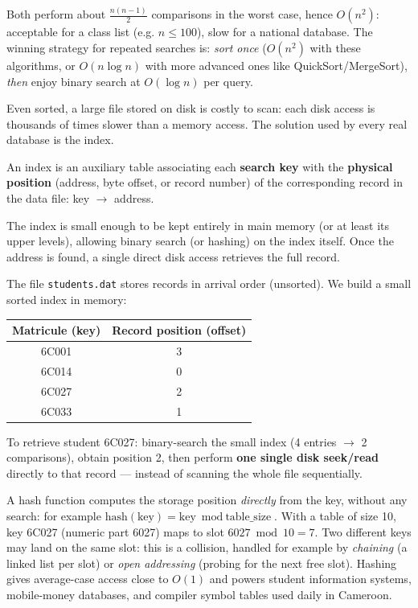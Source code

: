 \documentclass[11pt]{article}
\newcommand{\cle}[1]{{\popxbold\color{popdark}#1}}
\newcounter{popsec}
\newcounter{popsub}
\newcommand{\courssub}[1]{%
  \stepcounter{popsub}%
  \par\vspace{9pt}\noindent{\popxbold\fontsize{11.5}{13}\selectfont\color{popink}{\color{poporange}\thepopsec.\thepopsub}\hspace{6pt}#1}\par\nopagebreak\vspace{4pt}
}
\begin{document}
Both perform about $\frac{n(n-1)}{2}$ comparisons in the worst case, hence $O(n^2)$: acceptable for a class list (e.g. $n \le 100$), slow for a national database. The winning strategy for repeated searches is: \emph{sort once} ($O(n^2)$ with these algorithms, or $O(n \log n)$ with more advanced ones like QuickSort/MergeSort), \emph{then} enjoy binary search at $O(\log n)$ per query.

\courssub{Indexing: from Key to Address}

Even sorted, a large file stored on disk is costly to scan: each disk access is thousands of times slower than a memory access. The solution used by every real database is the \cle{index}.

\begin{definition}[Index]
An \cle{index} is an auxiliary table associating each \textbf{search key} with the \textbf{physical position} (address, byte offset, or record number) of the corresponding record in the data file: key $\to$ address.
\end{definition}

The index is small enough to be kept entirely in main memory (or at least its upper levels), allowing binary search (or hashing) on the index itself. Once the address is found, a single direct disk access retrieves the full record.

\begin{exemplebox}
The file \texttt{students.dat} stores records in arrival order (unsorted). We build a small sorted index in memory:
\begin{center}
\begin{tabular}{|c|c|}
\hline
\rowcolor{popblueL} \textbf{Matricule (key)} & \textbf{Record position (offset)} \\
\hline
6C001 & 3 \\
\hline
6C014 & 0 \\
\hline
6C027 & 2 \\
\hline
6C033 & 1 \\
\hline
\end{tabular}
\end{center}
To retrieve student 6C027: binary-search the small index (4 entries $\to$ 2 comparisons), obtain position 2, then perform \textbf{one single disk seek/read} directly to that record — instead of scanning the whole file sequentially.
\end{exemplebox}

\begin{savaistu}
A \cle{hash function} computes the storage position \emph{directly} from the key, without any search: for example $\text{hash}(\text{key}) = \text{key} \bmod \text{table\_size}$. With a table of size 10, key 6C027 (numeric part 6027) maps to slot $6027 \bmod 10 = 7$. Two different keys may land on the same slot: this is a \cle{collision}, handled for example by \emph{chaining} (a linked list per slot) or \emph{open addressing} (probing for the next free slot). Hashing gives average-case access close to $O(1)$ and powers student information systems, mobile-money databases, and compiler symbol tables used daily in Cameroon.
\end{savaistu}
\end{document}
